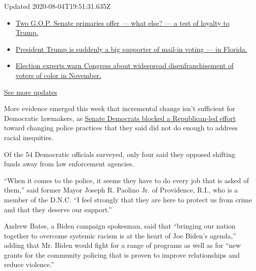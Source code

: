 Updated 2020-08-04T19:51:31.635Z

\begin{itemize}
\tightlist
\item
  \href{https://www.nytimes.com/2020/08/04/us/elections/primary-election-michigan-arizona-kansas.html?action=click\&pgtype=Article\&state=default\&region=MAIN_CONTENT_1\&context=storylines_live_updates\#link-3924dd44}{Two
  G.O.P. Senate primaries offer --- what else? --- a test of loyalty to
  Trump.}
\item
  \href{https://www.nytimes.com/2020/08/04/us/elections/primary-election-michigan-arizona-kansas.html?action=click\&pgtype=Article\&state=default\&region=MAIN_CONTENT_1\&context=storylines_live_updates\#link-32b39e33}{President
  Trump is suddenly a big supporter of mail-in voting --- in Florida.}
\item
  \href{https://www.nytimes.com/2020/08/04/us/elections/primary-election-michigan-arizona-kansas.html?action=click\&pgtype=Article\&state=default\&region=MAIN_CONTENT_1\&context=storylines_live_updates\#link-6d019753}{Election
  experts warn Congress about widespread disenfranchisement of voters of
  color in November.}
\end{itemize}

\href{https://www.nytimes.com/2020/08/04/us/elections/primary-election-michigan-arizona-kansas.html?action=click\&pgtype=Article\&state=default\&region=MAIN_CONTENT_1\&context=storylines_live_updates}{See
more updates}

More evidence emerged this week that incremental change isn't sufficient
for Democratic lawmakers, as
\href{https://www.nytimes.com/2020/06/24/us/politics/senate-police-bill.html}{Senate
Democrats blocked a Republican-led effort} toward changing police
practices that they said did not do enough to address racial inequities.

Of the 54 Democratic officials surveyed, only four said they opposed
shifting funds away from law enforcement agencies.

``When it comes to the police, it seems they have to do every job that
is asked of them,'' said former Mayor Joseph R. Paolino Jr. of
Providence, R.I., who is a member of the D.N.C. ``I feel strongly that
they are here to protect us from crime and that they deserve our
support.''

Andrew Bates, a Biden campaign spokesman, said that ``bringing our
nation together to overcome systemic racism is at the heart of Joe
Biden's agenda,'' adding that Mr. Biden would fight for a range of
programs as well as for ``new grants for the community policing that is
proven to improve relationships and reduce violence.''

